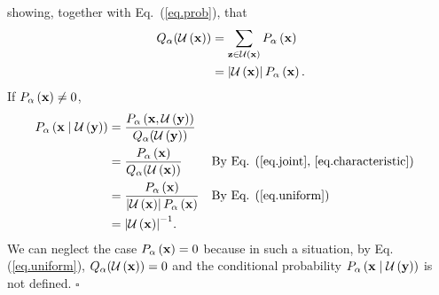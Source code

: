 \documentclass[%
prx,
reprint,
superscriptaddress,
nofootinbib,
 amsmath,amssymb,
 aps,
]{revtex4-2}
\newcommand{\xin}{{{\bf x}^{\text{input}}}}
\begin{document}
showing, together with Eq.~(\ref{eq.prob}), that
\begin{align}
Q_{\alpha}(\mathcal{U}\left({\bf x}\right)) &= \sum_{{\bf z} \in \mathcal{U}\left({\bf x}\right)} P_{\alpha}\left({\bf x}\right)\notag\\
&= \left\lvert\mathcal{U}\left({\bf x}\right)\right\rvert P_{\alpha}\left({\bf x}\right).\label{eq.uniform}
\end{align}
If $P_{\alpha}\left({\bf x}\right) \neq 0$,
\begin{align}
P_{\alpha}\left({\bf x} \mid \mathcal{U}\left({\bf y}\right)\right) &= \frac{P_{\alpha}\left({\bf x}, \mathcal{U}\left({\bf y}\right)\right)}{Q_{\alpha}(\mathcal{U}\left({\bf y}\right))}\notag\\&= \frac{P_{\alpha}\left({\bf x}\right)}{Q_{\alpha}(\mathcal{U}\left({\bf x}\right))}&&\textrm{By Eq. (\ref{eq.joint}, \ref{eq.characteristic})}\notag\\
&= \frac{P_{\alpha}\left({\bf x}\right)}{\left\lvert\mathcal{U}\left({\bf x}\right)\right\rvert P_{\alpha}\left({\bf x}\right)}&&\textrm{By Eq. (\ref{eq.uniform})}\notag\\
&= {\left\lvert\mathcal{U}\left({\bf x}\right)\right\rvert}^{-1}.\notag
\end{align}%
We can neglect the case $P_{\alpha}\left({\bf x}\right) = 0$ because in such a situation, by Eq. (\ref{eq.uniform}), $Q_{\alpha}(\mathcal{U}\left({\bf x}\right)) = 0$ and the conditional probability $P_{\alpha}\left({\bf x} \mid \mathcal{U}\left({\bf y}\right)\right)$ is not defined.
$\square$


\end{document}
